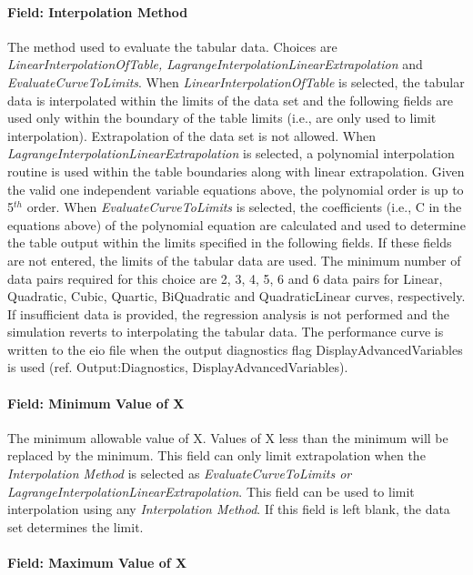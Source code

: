 \paragraph{Field: Interpolation Method}\label{field-interpolation-method}

The method used to evaluate the tabular data. Choices are \emph{LinearInterpolationOfTable, LagrangeInterpolationLinearExtrapolation} and \emph{EvaluateCurveToLimits}. When \emph{LinearInterpolationOfTable} is selected, the tabular data is interpolated within the limits of the data set and the following fields are used only within the boundary of the table limits (i.e., are only used to limit interpolation). Extrapolation of the data set is not allowed. When \emph{LagrangeInterpolationLinearExtrapolation} is selected, a polynomial interpolation routine is used within the table boundaries along with linear extrapolation. Given the valid one independent variable equations above, the polynomial order is up to 5\(^{th}\) order. When \emph{EvaluateCurveToLimits} is selected, the coefficients (i.e., C in the equations above) of the polynomial equation are calculated and used to determine the table output within the limits specified in the following fields. If these fields are not entered, the limits of the tabular data are used. The minimum number of data pairs required for this choice are 2, 3, 4, 5, 6 and 6 data pairs for Linear, Quadratic, Cubic, Quartic, BiQuadratic and QuadraticLinear curves, respectively. If insufficient data is provided, the regression analysis is not performed and the simulation reverts to interpolating the tabular data. The performance curve is written to the eio file when the output diagnostics flag DisplayAdvancedVariables is used (ref. Output:Diagnostics, DisplayAdvancedVariables).

\paragraph{Field: Minimum Value of X}\label{field-minimum-value-of-x-000}

The minimum allowable value of X. Values of X less than the minimum will be replaced by the minimum. This field can only limit extrapolation when the \emph{Interpolation Method} is selected as \emph{EvaluateCurveToLimits or LagrangeInterpolationLinearExtrapolation}. This field can be used to limit interpolation using any \emph{Interpolation Method}. If this field is left blank, the data set determines the limit.

\paragraph{Field: Maximum Value of X}\label{field-maximum-value-of-x-000}

